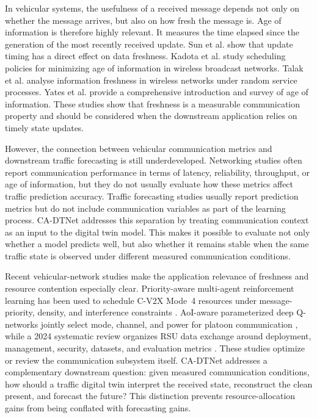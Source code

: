 \documentclass[pdflatex,sn-mathphys-num]{sn-jnl}%
\newenvironment{changed}{}{}
\theoremstyle{thmstyleone}%
\theoremstyle{thmstyletwo}%
\theoremstyle{thmstylethree}%
\begin{document}
In vehicular systems, the usefulness of a received message depends not only on whether the message arrives, but also on how fresh the message is. Age of information is therefore highly relevant. It measures the time elapsed since the generation of the most recently received update. Sun et al. \cite{sun2017update} show that update timing has a direct effect on data freshness. Kadota et al. \cite{kadota2018aoi} study scheduling policies for minimizing age of information in wireless broadcast networks. Talak et al. \cite{talak2020aoi} analyse information freshness in wireless networks under random service processes. Yates et al. \cite{yates2021aoi} provide a comprehensive introduction and survey of age of information. These studies show that freshness is a measurable communication property and should be considered when the downstream application relies on timely state updates.

However, the connection between vehicular communication metrics and downstream traffic forecasting is still underdeveloped. Networking studies often report communication performance in terms of latency, reliability, throughput, or age of information, but they do not usually evaluate how these metrics affect traffic prediction accuracy. Traffic forecasting studies usually report prediction metrics but do not include communication variables as part of the learning process. CA-DTNet addresses this separation by treating communication context as an input to the digital twin model. This makes it possible to evaluate not only whether a model predicts well, but also whether it remains stable when the same traffic state is observed under different measured communication conditions.

\begin{changed}
Recent vehicular-network studies make the application relevance of freshness and resource contention especially clear. Priority-aware multi-agent reinforcement learning has been used to schedule C-V2X Mode~4 resources under message-priority, density, and interference constraints \cite{shakir2025priority}. AoI-aware parameterized deep Q-networks jointly select mode, channel, and power for platoon communication \cite{shakir2026pdqn}, while a 2024 systematic review organizes RSU data exchange around deployment, management, security, datasets, and evaluation metrics \cite{shakir2024rsu}. These studies optimize or review the communication subsystem itself. CA-DTNet addresses a complementary downstream question: given measured communication conditions, how should a traffic digital twin interpret the received state, reconstruct the clean present, and forecast the future? This distinction prevents resource-allocation gains from being conflated with forecasting gains.
\end{changed}
\end{document}
